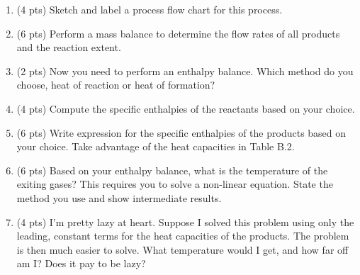 \documentclass[11pt]{article}
\begin{document}
\begin{enumerate}
\item (4 pts) Sketch and label a process flow chart for this process.
\item (6 pts) Perform a mass balance to determine the flow rates of all products and the reaction extent.
\item (2 pts) Now you need to perform an enthalpy balance.  Which method do you choose, heat of reaction or heat of formation?
\item (4 pts) Compute the specific enthalpies of the reactants based on your choice.
\item (6 pts) Write expression for the specific enthalpies of the products based on your choice.  Take advantage of the heat capacities in Table B.2.
\item (6 pts) Based on your enthalpy balance, what is the temperature of the exiting gases?  This requires you to solve a non-linear equation.  State the method you use and show intermediate results.
\item (4 pts) I'm pretty lazy at heart.  Suppose I solved this problem using only the leading, constant terms for the heat capacities of the products.  The problem is then much easier to solve.  What temperature would I get, and how far off am I?  Does it pay to be lazy?
\end{enumerate}
\end{document}
